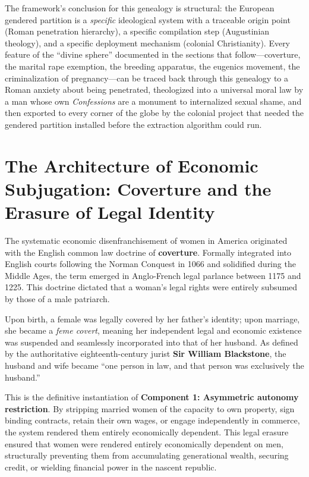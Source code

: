 The framework's conclusion for this genealogy is structural: the European gendered partition is a \textit{specific} ideological system with a traceable origin point (Roman penetration hierarchy), a specific compilation step (Augustinian theology), and a specific deployment mechanism (colonial Christianity). Every feature of the ``divine sphere'' documented in the sections that follow---coverture, the marital rape exemption, the breeding apparatus, the eugenics movement, the criminalization of pregnancy---can be traced back through this genealogy to a Roman anxiety about being penetrated, theologized into a universal moral law by a man whose own \textit{Confessions} are a monument to internalized sexual shame, and then exported to every corner of the globe by the colonial project that needed the gendered partition installed before the extraction algorithm could run.

\section{The Architecture of Economic Subjugation: Coverture and the Erasure of Legal Identity}

The systematic economic disenfranchisement of women in America originated with the English common law doctrine of \textbf{coverture}. Formally integrated into English courts following the Norman Conquest in 1066 and solidified during the Middle Ages, the term emerged in Anglo-French legal parlance between 1175 and 1225. This doctrine dictated that a woman’s legal rights were entirely subsumed by those of a male patriarch. 

Upon birth, a female was legally covered by her father’s identity; upon marriage, she became a \textit{feme covert}, meaning her independent legal and economic existence was suspended and seamlessly incorporated into that of her husband. As defined by the authoritative eighteenth-century jurist \textbf{Sir William Blackstone}, the husband and wife became ``one person in law, and that person was exclusively the husband.'' 

This is the definitive instantiation of \textbf{Component 1: Asymmetric autonomy restriction}. By stripping married women of the capacity to own property, sign binding contracts, retain their own wages, or engage independently in commerce, the system rendered them entirely economically dependent. This legal erasure ensured that women were rendered entirely economically dependent on men, structurally preventing them from accumulating generational wealth, securing credit, or wielding financial power in the nascent republic. 

